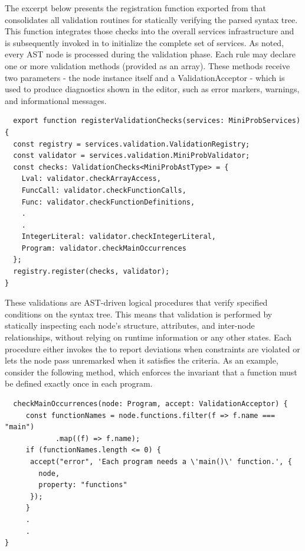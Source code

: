 The excerpt below presents the registration function exported from  that consolidates all validation routines for statically
verifying the parsed syntax tree. This function integrates those checks into the overall services infrastructure and is subsequently invoked in  to
initialize the complete set of services. As noted, every AST node is processed during the validation phase. Each rule may declare one or more validation methods
(provided as an array). These methods receive two parameters - the node instance itself and a ValidationAcceptor - which is used to produce diagnostics shown in the editor, such as error markers, warnings, and informational messages.


\begin{verbatim}
  export function registerValidationChecks(services: MiniProbServices) {
  const registry = services.validation.ValidationRegistry;
  const validator = services.validation.MiniProbValidator;
  const checks: ValidationChecks<MiniProbAstType> = {
    Lval: validator.checkArrayAccess,
    FuncCall: validator.checkFunctionCalls,
    Func: validator.checkFunctionDefinitions,
    .
    .
    IntegerLiteral: validator.checkIntegerLiteral,
    Program: validator.checkMainOccurrences
  };
  registry.register(checks, validator);
}
\end{verbatim}

These validations are AST-driven logical procedures that verify specified conditions on the syntax tree. This means that validation is performed by statically inspecting
each node's structure, attributes, and inter-node relationships, without relying on runtime information or any other states.
Each procedure either invokes the  to report deviations when constraints are violated or lets the node pass unremarked when it
satisfies the criteria. As an example, consider the following  method, which enforces the invariant that a  function must be defined exactly once in each program.
\begin{verbatim}
  checkMainOccurrences(node: Program, accept: ValidationAcceptor) {
     const functionNames = node.functions.filter(f => f.name === "main")
            .map((f) => f.name);
     if (functionNames.length <= 0) {
      accept("error", 'Each program needs a \'main()\' function.', {
        node,
        property: "functions"
      });
     }
     .
     .
}
\end{verbatim}
\vspace{1em}

